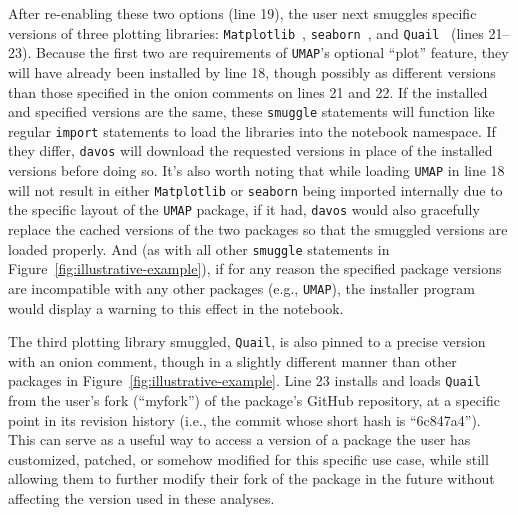 \documentclass[preprint,12pt,a4paper]{elsarticle}
\begin{document}
After re-enabling these two options (line 19), the user next smuggles specific versions of three plotting libraries: \texttt{Matplotlib}~\cite{Hunt07}, \texttt{seaborn}~\cite{Wask21}, and \texttt{Quail}~\cite{HeusEtal17} (lines 21--23). Because the first two are requirements of \texttt{UMAP}'s optional ``plot'' feature, they will have already been installed by line 18, though possibly as different versions than those specified in the onion comments on lines 21 and 22. If the installed and specified versions are the same, these \texttt{smuggle} statements will function like regular \texttt{import} statements to load the libraries into the notebook namespace. If they differ, \texttt{davos} will download the requested versions in place of the installed versions before doing so. It's also worth noting that while loading \texttt{UMAP} in line 18 will not result in either \texttt{Matplotlib} or \texttt{seaborn} being imported internally due to the specific layout of the \texttt{UMAP} package, if it had, \texttt{davos} would also gracefully replace the cached versions of the two packages so that the smuggled versions are loaded properly. And (as with all other \texttt{smuggle} statements in Figure~\ref{fig:illustrative-example}), if for any reason the specified package versions are incompatible with any other packages (e.g., \texttt{UMAP}), the installer program would display a warning to this effect in the notebook.

The third plotting library smuggled, \texttt{Quail}, is also pinned to a precise version with an onion comment, though in a slightly different manner than other packages in Figure~\ref{fig:illustrative-example}. Line 23 installs and loads \texttt{Quail} from the user's fork (``myfork'') of the package's GitHub repository, at a specific point in its revision history (i.e., the commit whose short hash is ``6c847a4''). This can serve as a useful way to access a version of a package the user has customized, patched, or somehow modified for this specific use case, while still allowing them to further modify their fork of the package in the future without affecting the version used in these analyses.
\end{document}
